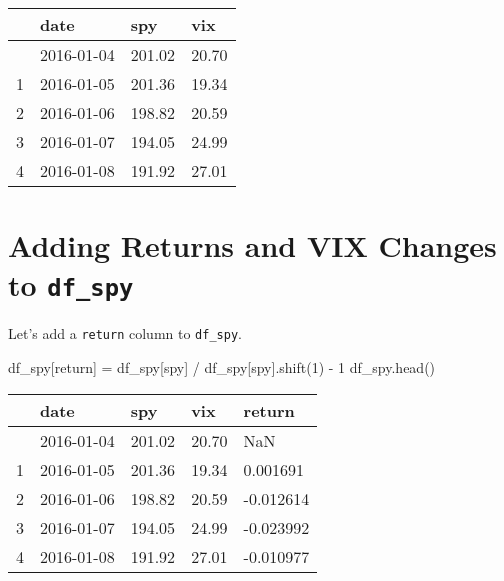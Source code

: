 \documentclass[
  letterpaper,
  DIV=11,
  numbers=noendperiod]{scrreprt}
\newenvironment{Shaded}{\begin{snugshade}}{\end{snugshade}}
\newcommand{\DecValTok}[1]{\textcolor[rgb]{0.68,0.00,0.00}{#1}}
\newcommand{\NormalTok}[1]{\textcolor[rgb]{0.00,0.23,0.31}{#1}}
\newcommand{\OperatorTok}[1]{\textcolor[rgb]{0.37,0.37,0.37}{#1}}
\newcommand{\StringTok}[1]{\textcolor[rgb]{0.13,0.47,0.30}{#1}}
\begin{document}
\begin{longtable}[]{@{}llll@{}}
\toprule\noalign{}
& date & spy & vix \\
\midrule\noalign{}
\endhead
\bottomrule\noalign{}
\endlastfoot
0 & 2016-01-04 & 201.02 & 20.70 \\
1 & 2016-01-05 & 201.36 & 19.34 \\
2 & 2016-01-06 & 198.82 & 20.59 \\
3 & 2016-01-07 & 194.05 & 24.99 \\
4 & 2016-01-08 & 191.92 & 27.01 \\
\end{longtable}

\hypertarget{adding-returns-and-vix-changes-to-df_spy}{%
\section{\texorpdfstring{Adding Returns and VIX Changes to
\texttt{df\_spy}}{Adding Returns and VIX Changes to df\_spy}}\label{adding-returns-and-vix-changes-to-df_spy}}

Let's add a \texttt{return} column to \texttt{df\_spy}.

\begin{Shaded}
\begin{Highlighting}[]
\NormalTok{df\_spy[}\StringTok{\textquotesingle{}return\textquotesingle{}}\NormalTok{] }\OperatorTok{=}\NormalTok{ df\_spy[}\StringTok{\textquotesingle{}spy\textquotesingle{}}\NormalTok{] }\OperatorTok{/}\NormalTok{ df\_spy[}\StringTok{\textquotesingle{}spy\textquotesingle{}}\NormalTok{].shift(}\DecValTok{1}\NormalTok{) }\OperatorTok{{-}} \DecValTok{1}
\NormalTok{df\_spy.head()}
\end{Highlighting}
\end{Shaded}

\begin{longtable}[]{@{}lllll@{}}
\toprule\noalign{}
& date & spy & vix & return \\
\midrule\noalign{}
\endhead
\bottomrule\noalign{}
\endlastfoot
0 & 2016-01-04 & 201.02 & 20.70 & NaN \\
1 & 2016-01-05 & 201.36 & 19.34 & 0.001691 \\
2 & 2016-01-06 & 198.82 & 20.59 & -0.012614 \\
3 & 2016-01-07 & 194.05 & 24.99 & -0.023992 \\
4 & 2016-01-08 & 191.92 & 27.01 & -0.010977 \\
\end{longtable}
\end{document}
